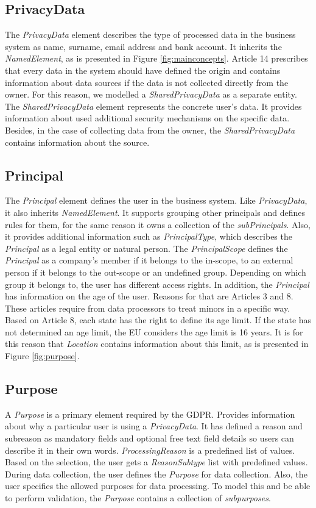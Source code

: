 \documentclass[11pt,english]{article}
\begin{document}
\subsection{PrivacyData}
The \emph{PrivacyData} element describes the type of processed data in the business system as name, surname, email address and bank account. It inherits the \emph{NamedElement}, as is presented in Figure \ref{fig:mainconcepts}. Article 14 prescribes that every data in the system should have defined the origin and contains information about data sources if the data is not collected directly from the owner. For this reason, we modelled a \emph{SharedPrivacyData} as a separate entity. The \emph{SharedPrivacyData} element represents the concrete user's data. It provides information about used additional security mechanisms on the specific data. Besides, in the case of collecting data from the owner, the \emph{SharedPrivacyData} contains information about the source.
\subsection{Principal}
The \emph{Principal} element defines the user in the business system. Like \emph{PrivacyData}, it also inherits \emph{NamedElement}. It supports grouping other principals and defines rules for them, for the same reason it owns a collection of the \emph{subPrincipals}. Also, it provides additional information such as \emph{PrincipalType}, which describes the \emph{Principal} as a legal entity or natural person. The \emph{PrincipalScope} defines the \emph{Principal} as a company's member if it belongs to the in-scope, to an external person if it belongs to the out-scope or an undefined group. Depending on which group it belongs to, the user has different access rights. In addition, the \emph{Principal} has information on the age of the user. 
Reasons for that are Articles 3 and 8. These articles require from data processors to treat minors in a specific way. Based on Article 8, each state has the right to define its age limit. If the state has not determined an age limit, the EU considers the age limit is 16 years. It is for this reason that \emph{Location} contains information about this limit, as is presented in Figure \ref{fig:purpose}.
\subsection{Purpose}
A \emph{Purpose} is a primary element required by the GDPR. Provides information about why a particular user is using a \emph{PrivacyData}. It has defined a reason and subreason as mandatory fields and optional free text field details so users can describe it in their own words. \emph{ProcessingReason} is a predefined list of values. Based on the selection, the user gets a \emph{ReasonSubtype} list with predefined values. During data collection, the user defines the \emph{Purpose} for data collection. Also, the user specifies the allowed purposes for data processing. To model this and be able to perform validation, the \emph{Purpose} contains a collection of \emph{subpurposes}. 
\end{document}
